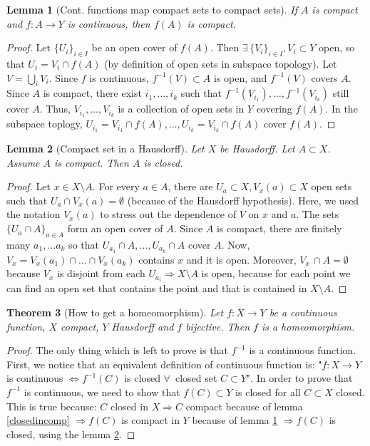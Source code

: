 \documentclass[a4paper,11pt,titlepage, article, oneside]{memoir}
\numberwithin{equation}{section}
\newtheorem{theorem}{Theorem}[section]
\newtheorem{lemma}[theorem]{Lemma}
\theoremstyle{definition}
\theoremstyle{remark}
\begin{document}
\begin{lemma} [Cont. functions map compact sets to compact sets] \label{contcomp}
If $A$ is compact and $f \colon A \rightarrow Y$ is continuous, then $f(A)$ is compact.
\end{lemma}
\begin{proof}
Let $\{U_i\}_{i \in I}$ be an open cover of $f(A)$. Then $\exists\,  \{V_i\}_{i \in I}, V_i \subset Y$ open, so that $U_i = V_i \cap f(A)$ (by definition of open sets in subspace topology). Let $V = \bigcup_i V_i$. Since $f$ is continuous, $f^{-1}(V) \subset A$ is open, and $f^{-1}(V)$ covers $A$. Since $A$ is compact, there exist $i_1, \ldots, i_k$ such that $f^{-1}(V_{i_1}), \ldots, f^{-1}(V_{i_k})$ still cover $A$. Thus, $V_{i_1},\ldots, V_{i_k}$ is a collection of open sets in $Y$ covering $f(A)$. In the subspace toplogy, $U_{i_1} = V_{i_1} \cap f(A), \ldots, U_{i_k} = V_{i_k} \cap f(A)$ cover $f(A)$.
\end{proof}

\begin{lemma}[Compact set in a Hausdorff] \label{compinhauss}
Let $X$ be Hausdorff. Let $A \subset X$. Assume $A$ is compact. Then $A$ is closed.
\end{lemma}
\begin{proof}
Let $x \in X \setminus A$. For every $a \in A$, there are $U_a \subset X, V_x(a) \subset X$ open sets such that $U_a \cap V_x(a) = \emptyset$ (because of the Hausdorff hypothesis). Here, we used the notation $V_x(a)$ to stress out the dependence of $V$ on $x$ and $a$. The sets $\{U_a \cap A\}_{a \in A}$ form an open cover of $A$. Since $A$ is compact, there are finitely many $a_1, \ldots a_k$ so that $U_{a_1} \cap A, \ldots, U_{a_k} \cap A$ cover $A$. Now, $V_x = V_x(a_1) \cap \ldots \cap V_x(a_k)$ contains $x$ and it is open. Moreover, $V_x \,\cap A = \emptyset$ because $V_x$ is disjoint from each $U_{a_i} \Rightarrow X \setminus A$ is open, because for each point we can find an open set that contains the point and that is contained in $X \setminus A$.
\end{proof}

\begin{theorem} [How to get a homeomorphism]
Let $f \colon X \rightarrow Y$ be a continuous function, $X$ compact, $Y$ Hausdorff and $f$ bijective. Then $f$ is a homeomorphism.
\end{theorem}
\begin{proof}
The only thing which is left to prove is that $f^{-1}$ is a continuous function. First, we notice that an equivalent definition of continuous function is: "$f \colon X \rightarrow Y$ is continuous $\Leftrightarrow f^{-1}(C)$ is closed $\forall \, $ closed set $C \subset Y$". In order to prove that $f^{-1}$ is continuous, we need to show that $f(C) \subset Y$ is closed for all $C \subset X$ closed. This is true because: $C$ closed in $X \Rightarrow C$ compact because of lemma \ref{closedincomp} $\Rightarrow f(C)$ is compact in $Y$ because of lemma \ref{contcomp} $\Rightarrow f(C)$ is closed, using the lemma \ref{compinhauss}.
\end{proof}
\end{document}
